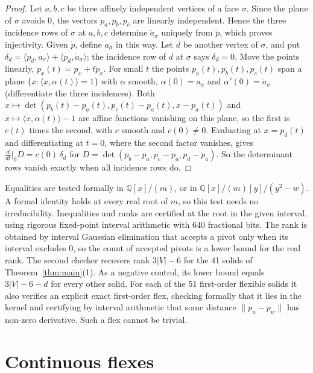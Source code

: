 \documentclass[11pt]{amsart}
\theoremstyle{remark}
\newcommand{\Q}{\mathbb Q}
\begin{document}
\begin{proof}
Let $a,b,c$ be three affinely independent vertices of a face $\sigma$. Since the plane of $\sigma$ avoids $0$, the vectors $p_a,p_b,p_c$ are linearly independent. Hence the three incidence rows of $\sigma$ at $a,b,c$ determine $\dot a_\sigma$ uniquely from $\dot p$, which proves injectivity. Given $\dot p$, define $\dot a_\sigma$ in this way. Let $d$ be another vertex of $\sigma$, and put $\delta_d=\langle\dot p_d,a_\sigma\rangle+\langle p_d,\dot a_\sigma\rangle$; the incidence row of $d$ at $\sigma$ says $\delta_d=0$. Move the points linearly, $p_x(t)=p_x+t\dot p_x$. For small $t$ the points $p_a(t),p_b(t),p_c(t)$ span a plane $\{x:\langle x,\alpha(t)\rangle=1\}$ with $\alpha$ smooth, $\alpha(0)=a_\sigma$ and $\alpha'(0)=\dot a_\sigma$ (differentiate the three incidences). Both $x\mapsto\det(p_b(t)-p_a(t),p_c(t)-p_a(t),x-p_a(t))$ and $x\mapsto\langle x,\alpha(t)\rangle-1$ are affine functions vanishing on this plane, so the first is $c(t)$ times the second, with $c$ smooth and $c(0)\neq0$. Evaluating at $x=p_d(t)$ and differentiating at $t=0$, where the second factor vanishes, gives $\frac{d}{dt}\big|_0 D=c(0)\,\delta_d$ for $D=\det(p_b-p_a,p_c-p_a,p_d-p_a)$. So the determinant rows vanish exactly when all incidence rows do.
\end{proof}

Equalities are tested formally in $\Q[x]/(m)$, or in $\Q[x]/(m)[y]/(y^2-w)$. A formal identity holds at every real root of $m$, so this test needs no irreducibility. Inequalities and ranks are certified at the root in the given interval, using rigorous fixed-point interval arithmetic with 640 fractional bits. The rank is obtained by interval Gaussian elimination that accepts a pivot only when its interval excludes 0, so the count of accepted pivots is a lower bound for the real rank. The second checker recovers rank $3|V|-6$ for the 41 solids of Theorem~\ref{thm:main}(1). As a negative control, its lower bound equals $3|V|-6-d$ for every other solid. For each of the 51 first-order flexible solids it also verifies an explicit exact first-order flex, checking formally that it lies in the kernel and certifying by interval arithmetic that some distance $\|p_u-p_w\|$ has non-zero derivative. Such a flex cannot be trivial.

\section{Continuous flexes}\label{sec:flex}
\end{document}
